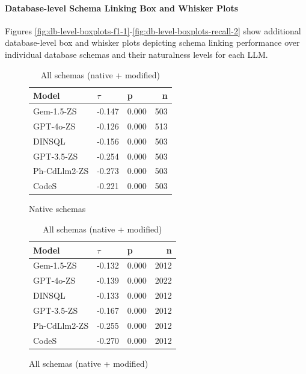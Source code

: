 \paragraph{Database-level Schema Linking Box and Whisker Plots}

Figures \ref{fig:db-level-boxplots-f1-1}-\ref{fig:db-level-boxplots-recall-2} show additional database-level box and whisker plots depicting schema linking performance over individual database schemas and their naturalness levels for each LLM.




\begin{table}[ht]
  \centering
  \caption{Kendall-Tau ($\tau$) Correlations between the \emph{Mean Token-to-Character Ratio} and \emph{Query Recall}.}
  \begin{subfigure}{.5\linewidth}
      \centering
      \caption{Native schemas}
      \begin{tabular}{lllr}
\toprule
Model & $\tau$ & p & n \\
\midrule
Gem-1.5-ZS & -0.147 & 0.000 & 503 \\
GPT-4o-ZS & -0.126 & 0.000 & 513 \\
DINSQL & -0.156 & 0.000 & 503 \\
GPT-3.5-ZS & -0.254 & 0.000 & 503 \\
Ph-CdLlm2-ZS & -0.273 & 0.000 & 503 \\
CodeS & -0.221 & 0.000 & 503 \\
\bottomrule
\end{tabular}

      \label{table:tokenratio-recall-ktau-native}
  \end{subfigure}%
  \begin{subfigure}{.5\linewidth}
      \centering
      \caption{All schemas (native + modified)}
      \begin{tabular}{lllr}
\toprule
Model & $\tau$ & p & n \\
\midrule
Gem-1.5-ZS & -0.132 & 0.000 & 2012 \\
GPT-4o-ZS & -0.139 & 0.000 & 2022 \\
DINSQL & -0.133 & 0.000 & 2012 \\
GPT-3.5-ZS & -0.167 & 0.000 & 2012 \\
Ph-CdLlm2-ZS & -0.255 & 0.000 & 2012 \\
CodeS & -0.270 & 0.000 & 2012 \\
\bottomrule
\end{tabular}

      \label{table:tokenratio-recall-ktau-all}
  \end{subfigure}
\end{table}

